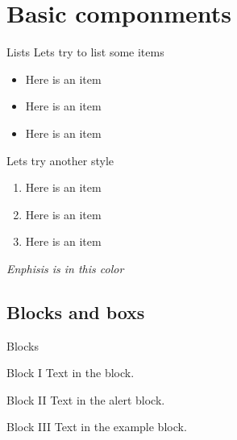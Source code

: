 \documentclass{libs/SUSTech_format}
\begin{document}
\section{Basic componments}

\begin{frame}{Lists}
    Lets try to list some items
    \begin{itemize}
        \item Here is an item
        \item Here is an item
        \item Here is an item
    \end{itemize}

    \vspace{0.4cm} %
    
    Lets try another style
    \begin{enumerate}
        \item Here is an item
        \item Here is an item
        \item Here is an item
    \end{enumerate}

    \vspace{0.2cm}

     \emph{Enphisis is in this color}
\end{frame}

\subsection{Blocks and boxs}
\begin{frame}{Blocks}
    \begin{block}{Block I}
        Text in the block.
    \end{block}

    \begin{alertblock}{Block II}
        Text in the alert block.
    \end{alertblock}

    \begin{exampleblock}{Block III}
        Text in the example block.
    \end{exampleblock}   
\end{frame}

\end{document}
